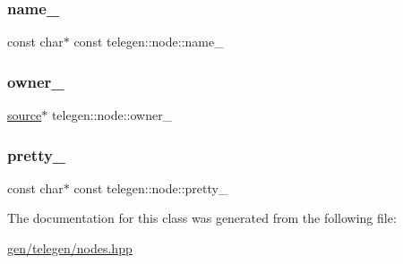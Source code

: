 \subsubsection{\texorpdfstring{name\+\_\+}{name\_}}
{\footnotesize\ttfamily const char$\ast$ const telegen\+::node\+::name\+\_\+\hspace{0.3cm}{\ttfamily [protected]}}

\mbox{\label{classtelegen_1_1node_ab97909f583b8777e9b95f11edfc869a8}} 
\subsubsection{\texorpdfstring{owner\+\_\+}{owner\_}}
{\footnotesize\ttfamily \hyperlink{classtelegen_1_1source}{source}$\ast$ telegen\+::node\+::owner\+\_\+\hspace{0.3cm}{\ttfamily [protected]}}

\mbox{\label{classtelegen_1_1node_abfa84da09528702afb75b46771ab9dcd}} 
\subsubsection{\texorpdfstring{pretty\+\_\+}{pretty\_}}
{\footnotesize\ttfamily const char$\ast$ const telegen\+::node\+::pretty\+\_\+\hspace{0.3cm}{\ttfamily [protected]}}



The documentation for this class was generated from the following file\+:\begin{DoxyCompactItemize}
\item 
\hyperlink{gen_2telegen_2nodes_8hpp}{gen/telegen/nodes.\+hpp}\end{DoxyCompactItemize}
